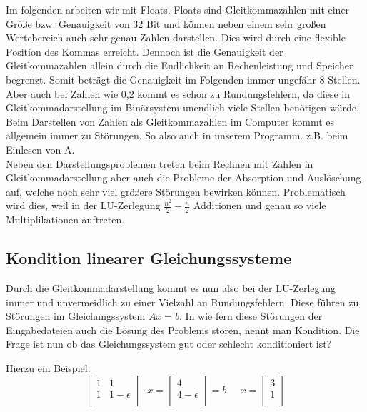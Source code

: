 \documentclass[course=erap]{aspdoc}
\begin{document}
Im folgenden arbeiten wir mit Floats. Floats sind Gleitkommazahlen mit einer Größe 
bzw. Genauigkeit von 32 Bit und können neben einem sehr großen Wertebereich auch 
sehr genau Zahlen darstellen. Dies wird durch eine flexible Position des Kommas erreicht. 
Dennoch ist die Genauigkeit der Gleitkommazahlen allein durch die Endlichkeit an 
Rechenleistung und Speicher begrenzt. Somit beträgt die 
Genauigkeit im Folgenden immer ungefähr 8 Stellen. Aber auch bei Zahlen wie 
0,2 kommt es schon zu Rundungsfehlern, da diese in Gleitkommadarstellung im Binärsystem unendlich 
viele Stellen benötigen würde. Beim Darstellen von Zahlen als Gleitkommazahlen im Computer 
kommt es allgemein immer zu Störungen. So also auch in unserem Programm. z.B. beim Einlesen von A.\\
Neben den Darstellungsproblemen treten beim Rechnen mit Zahlen in Gleitkommadarstellung aber auch 
die Probleme der Absorption und Auslöschung auf, welche noch sehr viel größere Störungen bewirken können. 
Problematisch wird dies, weil in der LU-Zerlegung $\frac{n^2}{2} - \frac{n}{2} $
Additionen und genau so viele Multiplikationen auftreten\cite[51]{M2017}. 

\subsection{Kondition linearer Gleichungssysteme}
Durch die Gleitkommadarstellung kommt es nun also bei der LU-Zerlegung immer und 
unvermeidlich zu einer Vielzahl an Rundungsfehlern. Diese führen zu Störungen im Gleichungssystem $Ax=b$. 
In wie fern diese Störungen der Eingabedateien auch die Lösung des Problems stören, nennt man Kondition\cite[46]{M2017}. 
Die Frage ist nun ob das Gleichungssystem gut oder schlecht konditioniert ist?

Hierzu ein Beispiel:
  \begin{equation}
    \label{absBeis}
    \begin{bmatrix}
    1	& 1	 \\
    1	& 1-\epsilon\\
    \end{bmatrix}
    \cdot x = 
    \begin{bmatrix}
    4 \\
    4- \epsilon\\
    \end{bmatrix}
    = b\;\;\;\;\;
    x = 
    \begin{bmatrix}
    3 \\
    1\\
    \end{bmatrix}
  \end{equation}
\end{document}
